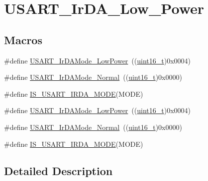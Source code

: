 \hypertarget{group___u_s_a_r_t___ir_d_a___low___power}{}\section{U\+S\+A\+R\+T\+\_\+\+Ir\+D\+A\+\_\+\+Low\+\_\+\+Power}
\label{group___u_s_a_r_t___ir_d_a___low___power}
\subsection*{Macros}
\begin{DoxyCompactItemize}
\item 
\#define \hyperlink{group___u_s_a_r_t___ir_d_a___low___power_ga00c2635d0e6ca1a5b158f1c1673e862f}{U\+S\+A\+R\+T\+\_\+\+Ir\+D\+A\+Mode\+\_\+\+Low\+Power}~((\hyperlink{_p_e___types_8h_a1f1825b69244eb3ad2c7165ddc99c956}{uint16\+\_\+t})0x0004)
\item 
\#define \hyperlink{group___u_s_a_r_t___ir_d_a___low___power_ga796cd5451deb896741206986bd6d03e6}{U\+S\+A\+R\+T\+\_\+\+Ir\+D\+A\+Mode\+\_\+\+Normal}~((\hyperlink{_p_e___types_8h_a1f1825b69244eb3ad2c7165ddc99c956}{uint16\+\_\+t})0x0000)
\item 
\#define \hyperlink{group___u_s_a_r_t___ir_d_a___low___power_ga7790838ff8ee71089da2c0e5bceee569}{I\+S\+\_\+\+U\+S\+A\+R\+T\+\_\+\+I\+R\+D\+A\+\_\+\+M\+O\+DE}(M\+O\+DE)
\item 
\#define \hyperlink{group___u_s_a_r_t___ir_d_a___low___power_ga00c2635d0e6ca1a5b158f1c1673e862f}{U\+S\+A\+R\+T\+\_\+\+Ir\+D\+A\+Mode\+\_\+\+Low\+Power}~((\hyperlink{_p_e___types_8h_a1f1825b69244eb3ad2c7165ddc99c956}{uint16\+\_\+t})0x0004)
\item 
\#define \hyperlink{group___u_s_a_r_t___ir_d_a___low___power_ga796cd5451deb896741206986bd6d03e6}{U\+S\+A\+R\+T\+\_\+\+Ir\+D\+A\+Mode\+\_\+\+Normal}~((\hyperlink{_p_e___types_8h_a1f1825b69244eb3ad2c7165ddc99c956}{uint16\+\_\+t})0x0000)
\item 
\#define \hyperlink{group___u_s_a_r_t___ir_d_a___low___power_ga7790838ff8ee71089da2c0e5bceee569}{I\+S\+\_\+\+U\+S\+A\+R\+T\+\_\+\+I\+R\+D\+A\+\_\+\+M\+O\+DE}(M\+O\+DE)
\end{DoxyCompactItemize}


\subsection{Detailed Description}


